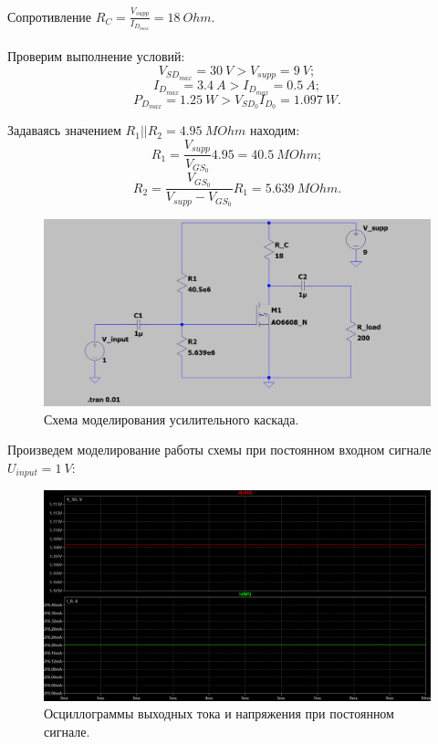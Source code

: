 \documentclass[12pt]{article}
\begin{document}
Сопротивление $R_C = \frac{V_{supp}}{I_{D_{max}}} = 18 \ Ohm$. \\
\ \\
Проверим выполнение условий: 
\[
    V_{SD_{max}} = 30 \ V > V_{supp} = 9 \ V;
\]
\[
    I_{D_{max}} = 3.4 \ A > I_{D_{max}} = 0.5 \ A;
\]
\[
    P_{D_{max}} = 1.25 \ W > V_{SD_0} I_{D_0} = 1.097 \ W.
\]

Задаваясь значением $R_1 || R_2 = 4.95 \ MOhm$ находим:
\[
    R_1 = \frac{V_{supp}}{V_{GS_0}} 4.95 = 40.5 \ MOhm;
\]
\[
    R_2 = \frac{V_{GS_0}}{V_{supp} - V_{GS_0}} R_1 = 5.639 \ MOhm.
\]

\begin{figure}[H]
    \centering
    \includegraphics[width=\textwidth]{3_scheme.png}
    \caption{Схема моделирования усилительного каскада.}
    \label{fig:3_scheme}
\end{figure}

Произведем моделирование работы схемы при постоянном входном сигнале $U_{input} = 1 \ V$:
\begin{figure}[H]
    \centering
    \includegraphics[width=\textwidth]{3_const_signal.png}
    \caption{Осциллограммы выходных тока и напряжения при постоянном сигнале.}
    \label{fig:3_const_signal}
\end{figure}
\end{document}
